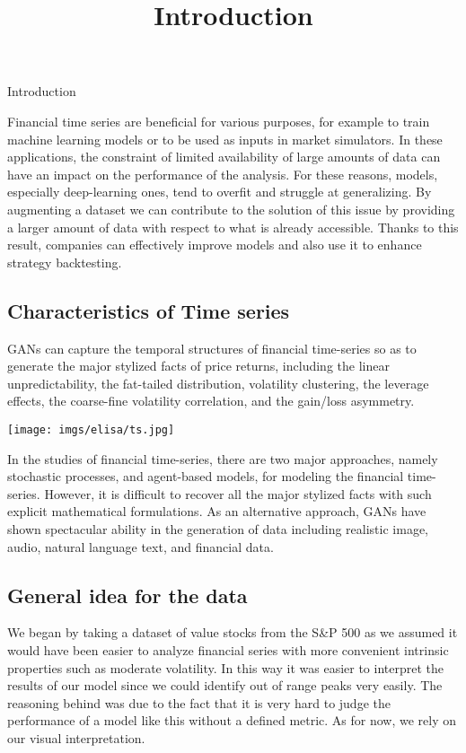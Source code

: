 \documentclass{article}
\title{Introduction}
\begin{document}
\begin{center}
    {\huge{Introduction}}
\end{center}    
    
    Financial time series are beneficial for various purposes, for example to train machine learning models or to be used as inputs in market simulators. In these applications, the constraint of limited availability of large amounts of data can have an impact on the performance of the analysis. For these reasons, models, especially deep-learning ones, tend to overfit and struggle at generalizing. By augmenting a dataset we can contribute to the solution of this issue by providing a larger amount of data with respect to what is already accessible. Thanks to this result, companies can effectively  improve models and also use it to enhance strategy backtesting. 
    \subsection*{Characteristics of Time series}
    GANs can capture the temporal structures of financial time-series so as to generate the major stylized facts of price returns, including the linear unpredictability, the fat-tailed distribution, volatility clustering, the leverage effects, the coarse-fine volatility correlation, and the gain/loss asymmetry. 
    \begin{center}
        \texttt{[image: imgs/elisa/ts.jpg]}
    \end{center}
    In the studies of financial time-series, there are two major approaches, namely stochastic processes, and agent-based models, for modeling the financial time-series. However, it is difficult to recover all the major stylized facts with such explicit mathematical formulations. As an alternative approach, GANs have shown spectacular ability in the generation of data including realistic image, audio, natural language text, and financial data.\\
   
    \subsection*{General idea for the data}
    We began by taking a dataset of value stocks from the S\&P 500 as we assumed it would have been easier to analyze financial series with more convenient intrinsic properties such as moderate volatility. In this way it was easier to interpret the results of our model since we could identify out of range peaks very easily. The reasoning behind was due to the fact that it is very hard to judge the performance of a model like this without a defined metric. As for now, we rely on our visual interpretation.\\ 
    
\end{document}
